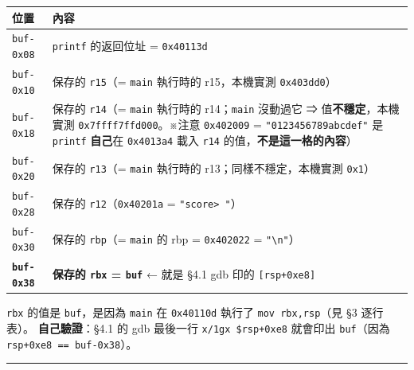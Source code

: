 \documentclass[10pt,a4paper]{article}
\newcounter{none}
\begin{document}
{\def\LTcaptype{none} %
\begin{longtable}[]{@{}
  >{\raggedright\arraybackslash}p{}
  >{\raggedright\arraybackslash}p{}@{}}
\toprule\noalign{}
\begin{minipage}[b]{\linewidth}\raggedright
位置
\end{minipage} & \begin{minipage}[b]{\linewidth}\raggedright
內容
\end{minipage} \\
\midrule\noalign{}
\endhead
\bottomrule\noalign{}
\endlastfoot
\texttt{buf-\allowbreak{}0x08} & \texttt{printf} 的返回位址 = \texttt{0x40113d} \\
\texttt{buf-\allowbreak{}0x10} & 保存的 \texttt{r15}（= \texttt{main} 執行時的
r15，本機實測 \texttt{0x403dd0}） \\
\texttt{buf-\allowbreak{}0x18} & 保存的 \texttt{r14}（= \texttt{main} 執行時的
r14；\texttt{main} 沒動過它 ⇒ 值\textbf{不穩定}，本機實測
\texttt{0x7ffff7ffd000}。※注意 \texttt{0x402009} =
\texttt{"0123456789abcdef"} 是 \texttt{printf} \textbf{自己}在
\texttt{0x4013a4} 載入 \texttt{r14} 的值，\textbf{不是這一格的內容}） \\
\texttt{buf-\allowbreak{}0x20} & 保存的 \texttt{r13}（= \texttt{main} 執行時的
r13；同樣不穩定，本機實測 \texttt{0x1}） \\
\texttt{buf-\allowbreak{}0x28} & 保存的 \texttt{r12}（\texttt{0x40201a} =
\texttt{"score\textgreater{}\allowbreak{}\ \allowbreak{}"}） \\
\texttt{buf-\allowbreak{}0x30} & 保存的 \texttt{rbp}（= \texttt{main} 的 rbp =
\texttt{0x402022} = \texttt{"\textbackslash{}\allowbreak{}n"}） \\
\textbf{\texttt{buf-\allowbreak{}0x38}} & \textbf{保存的 \texttt{rbx} = \texttt{buf}}
← 就是 §4.1 gdb 印的 \texttt{{[}rsp+0xe8{]}} \\
\end{longtable}
}

\texttt{rbx} 的值是 \texttt{buf}，是因為 \texttt{main} 在
\texttt{0x40110d} 執行了 \texttt{mov\ \allowbreak{}rbx,\allowbreak{}rsp}（見 §3 逐行表）。
\textbf{自己驗證}：§4.1 的 gdb 最後一行 \texttt{x/\allowbreak{}1gx\ \allowbreak{}\$\allowbreak{}rsp+0xe8}
就會印出 \texttt{buf}（因為 \texttt{rsp+0xe8\ \allowbreak{}==\ \allowbreak{}buf-\allowbreak{}0x38}）。

\begin{center}\rule{0.5\linewidth}{0.5pt}\end{center}
\end{document}
